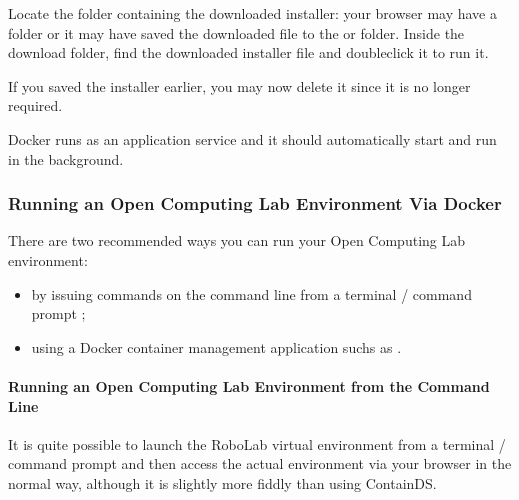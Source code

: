 \documentclass[letterpaper,10pt,english]{sphinxmanual}
\begin{document}
Locate the folder containing the downloaded installer: your browser may have a  folder or it may have saved the downloaded file to the  or  folder. Inside the download folder, find the downloaded installer file and double\sphinxhyphen{}click it to run it.



If you saved the installer earlier, you may now delete it since it is no longer required.

Docker runs as an application service and it should automatically start and run in the background.


\subsubsection{Running an Open Computing Lab Environment Via Docker}
\label{\detokenize{content/00_READ_ME_FIRST/Section_00_05_Accessing_RoboLab:Running-an-Open-Computing-Lab-Environment-Via-Docker}}
There are two recommended ways you can run your Open Computing Lab environment:
\begin{itemize}
\item {} 
by issuing commands on the command line from a terminal / command prompt ;

\item {} 
using a Docker container management application suchs as .

\end{itemize}


\paragraph{Running an Open Computing Lab Environment from the Command Line}
\label{\detokenize{content/00_READ_ME_FIRST/Section_00_05_Accessing_RoboLab:Running-an-Open-Computing-Lab-Environment-from-the-Command-Line}}
It is quite possible to launch the RoboLab virtual environment from a terminal / command prompt and then access the actual environment via your browser in the normal way, although it is slightly more fiddly than using ContainDS.
\end{document}
